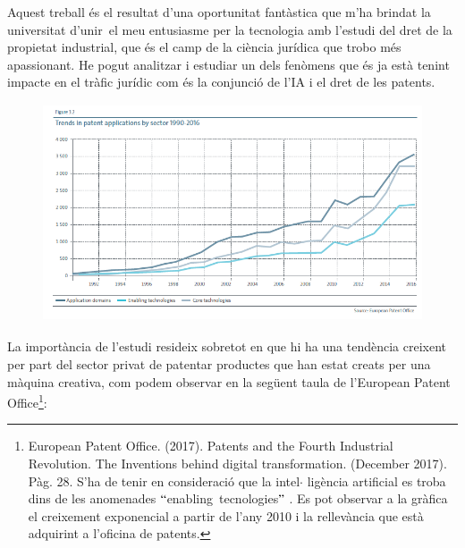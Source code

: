 \documentclass[12pt]{article}
\begin{document}
\vspace{\baselineskip}
\begin{justify}
Aquest treball és el resultat d’una oportunitat fantàstica que m’ha brindat la universitat d’unir\ el meu entusiasme per la tecnologia amb l’estudi del dret de la propietat industrial, que és el camp de la ciència jurídica que trobo més apassionant.  He pogut analitzar i estudiar un dels fenòmens que és ja està tenint impacte en el tràfic jurídic com és la conjunció de l’IA i el dret de les patents. 
\end{justify}\par


\vspace{\baselineskip}



\begin{figure}[H]
\advance\leftskip 0.15in		\includegraphics[width=5.08in,height=2.54in]{./media/image3.png}
\end{figure}



\begin{justify}
La importància de l’estudi resideix sobretot en que hi ha una tendència creixent per part del sector privat de patentar productes que han estat creats per una màquina creativa, com podem observar en la següent taula de l’European Patent Office\footnote{ European Patent Office. (2017). Patents and the Fourth Industrial Revolution. The Inventions behind digital transformation. (December 2017). Pàg. 28. S’ha de tenir en consideració que la intel$ \cdot $ ligència artificial es troba dins de les anomenades $``$enabling\ tecnologies$"$ . Es pot observar  a la gràfica el creixement exponencial a partir de l’any 2010 i la rellevància que està adquirint a l’oficina de patents.  }:
\end{justify}\par
\end{document}
